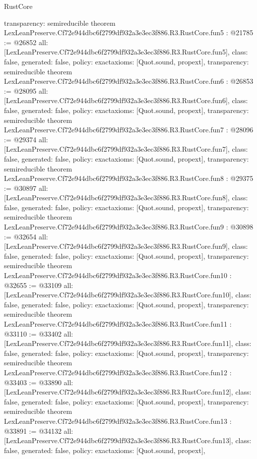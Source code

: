 \begin{lexlean}{RustCore}
\begin{coremodule}
{  transparency: semireducible
}
theorem LexLeanPreserve.Cf72e944dbc6f2799df932a3e3ec3f886.R3.RustCore.fun5 : @21785 := @26852 {
  all: [LexLeanPreserve.Cf72e944dbc6f2799df932a3e3ec3f886.R3.RustCore.fun5],
  class: false,
  generated: false,
  policy: exact{axioms: [Quot.sound, propext]},
  transparency: semireducible
}
theorem LexLeanPreserve.Cf72e944dbc6f2799df932a3e3ec3f886.R3.RustCore.fun6 : @26853 := @28095 {
  all: [LexLeanPreserve.Cf72e944dbc6f2799df932a3e3ec3f886.R3.RustCore.fun6],
  class: false,
  generated: false,
  policy: exact{axioms: [Quot.sound, propext]},
  transparency: semireducible
}
theorem LexLeanPreserve.Cf72e944dbc6f2799df932a3e3ec3f886.R3.RustCore.fun7 : @28096 := @29374 {
  all: [LexLeanPreserve.Cf72e944dbc6f2799df932a3e3ec3f886.R3.RustCore.fun7],
  class: false,
  generated: false,
  policy: exact{axioms: [Quot.sound, propext]},
  transparency: semireducible
}
theorem LexLeanPreserve.Cf72e944dbc6f2799df932a3e3ec3f886.R3.RustCore.fun8 : @29375 := @30897 {
  all: [LexLeanPreserve.Cf72e944dbc6f2799df932a3e3ec3f886.R3.RustCore.fun8],
  class: false,
  generated: false,
  policy: exact{axioms: [Quot.sound, propext]},
  transparency: semireducible
}
theorem LexLeanPreserve.Cf72e944dbc6f2799df932a3e3ec3f886.R3.RustCore.fun9 : @30898 := @32654 {
  all: [LexLeanPreserve.Cf72e944dbc6f2799df932a3e3ec3f886.R3.RustCore.fun9],
  class: false,
  generated: false,
  policy: exact{axioms: [Quot.sound, propext]},
  transparency: semireducible
}
theorem LexLeanPreserve.Cf72e944dbc6f2799df932a3e3ec3f886.R3.RustCore.fun10 : @32655 := @33109 {
  all: [LexLeanPreserve.Cf72e944dbc6f2799df932a3e3ec3f886.R3.RustCore.fun10],
  class: false,
  generated: false,
  policy: exact{axioms: [Quot.sound, propext]},
  transparency: semireducible
}
theorem LexLeanPreserve.Cf72e944dbc6f2799df932a3e3ec3f886.R3.RustCore.fun11 : @33110 := @33402 {
  all: [LexLeanPreserve.Cf72e944dbc6f2799df932a3e3ec3f886.R3.RustCore.fun11],
  class: false,
  generated: false,
  policy: exact{axioms: [Quot.sound, propext]},
  transparency: semireducible
}
theorem LexLeanPreserve.Cf72e944dbc6f2799df932a3e3ec3f886.R3.RustCore.fun12 : @33403 := @33890 {
  all: [LexLeanPreserve.Cf72e944dbc6f2799df932a3e3ec3f886.R3.RustCore.fun12],
  class: false,
  generated: false,
  policy: exact{axioms: [Quot.sound, propext]},
  transparency: semireducible
}
theorem LexLeanPreserve.Cf72e944dbc6f2799df932a3e3ec3f886.R3.RustCore.fun13 : @33891 := @34132 {
  all: [LexLeanPreserve.Cf72e944dbc6f2799df932a3e3ec3f886.R3.RustCore.fun13],
  class: false,
  generated: false,
  policy: exact{axioms: [Quot.sound, propext]},
}
\end{coremodule}
\end{lexlean}
